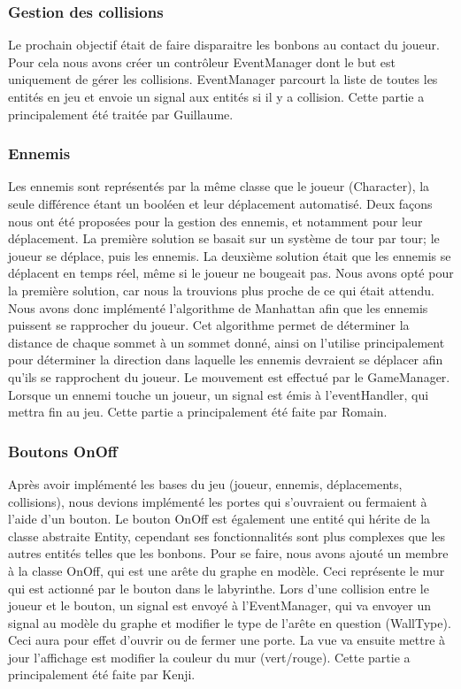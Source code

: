 \documentclass[a4paper]{article}
\begin{document}
\subsubsection{Gestion des collisions}
Le prochain objectif était de faire disparaitre les bonbons au contact du
joueur. Pour cela nous avons créer un contrôleur EventManager dont le but est
uniquement de gérer les collisions. EventManager parcourt la liste de toutes
les entités en jeu et envoie un signal aux entités si il y a collision.
Cette partie a principalement été traitée par Guillaume.

\subsubsection{Ennemis}
Les ennemis sont représentés par la même classe que le joueur (Character), la
seule différence étant un booléen et leur déplacement automatisé.
Deux façons nous ont été proposées pour la gestion des ennemis, et notamment
pour leur déplacement. La première solution se basait sur un système de tour par
tour; le joueur se déplace, puis les ennemis. La deuxième solution était que
les ennemis se déplacent en temps réel, même si le joueur ne bougeait pas.
Nous avons opté pour la première solution, car nous la trouvions plus proche
de ce qui était attendu.
Nous avons donc implémenté l'algorithme de Manhattan afin que les ennemis
puissent se rapprocher du joueur. Cet algorithme permet de déterminer la
distance de chaque sommet à un sommet donné, ainsi on l'utilise principalement
pour déterminer la direction dans laquelle les ennemis devraient se déplacer
afin qu'ils se rapprochent du joueur. Le mouvement est effectué par le
GameManager.
Lorsque un ennemi touche un joueur, un signal est émis à l'eventHandler, qui
mettra fin au jeu.
Cette partie a principalement été faite par Romain.

\subsubsection{Boutons OnOff}
Après avoir implémenté les bases du jeu (joueur, ennemis, déplacements,
collisions), nous devions implémenté les portes qui s'ouvraient ou fermaient
à l'aide d'un bouton. Le bouton OnOff est également une entité qui hérite
de la classe abstraite Entity, cependant ses fonctionnalités sont plus
complexes que les autres entités telles que les bonbons. Pour se faire, nous
avons ajouté un membre à la classe OnOff, qui est une arête du graphe en modèle.
Ceci représente le mur qui est actionné par le bouton dans le labyrinthe. Lors
d'une collision entre le joueur et le bouton, un signal est envoyé à
l'EventManager, qui va envoyer un signal au modèle du graphe et modifier le
type de l'arête en question (WallType). Ceci aura pour effet d'ouvrir ou de
fermer une porte. La vue va ensuite mettre à jour l'affichage est modifier la
couleur du mur (vert/rouge). Cette partie a principalement été faite par Kenji.
\end{document}
